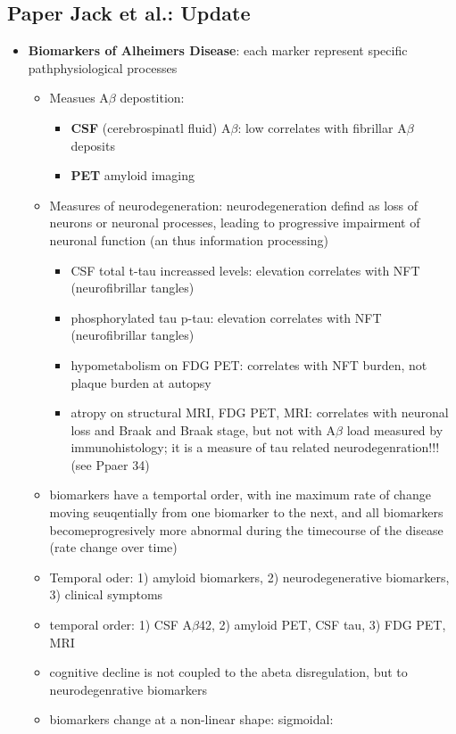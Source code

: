 \documentclass[fleqn]{article}\usepackage{caption}
\begin{document}
\subsection{Paper Jack et al.: Update}
\begin{itemize}
\item \textbf{Biomarkers of Alheimers Disease}:  each marker represent specific pathphysiological processes
\begin{itemize}
\item Measues A$\beta$ depostition:
\begin{itemize}
\item \textbf{CSF} (cerebrospinatl fluid) A$\beta$: low correlates with fibrillar A$\beta$ deposits
\item \textbf{PET} amyloid imaging
\end{itemize} 
\item Measures of neurodegeneration: neurodegeneration defind as loss of neurons or  neuronal processes,  leading to progressive impairment of neuronal function (an thus information processing)
\begin{itemize}
\item CSF total t-tau increassed levels: elevation correlates with NFT (neurofibrillar tangles)
\item phosphorylated tau p-tau: elevation correlates with NFT (neurofibrillar tangles)
\item hypometabolism on FDG PET: correlates with NFT burden, not plaque burden at autopsy
\item atropy on structural MRI, FDG PET, MRI: correlates with neuronal loss and Braak and Braak stage, but not with A$\beta$ load measured by immunohistology; it is a measure of tau related neurodegenration!!! (see Ppaer 34)
\end{itemize}
\item biomarkers have a temportal order, with ine maximum rate of change moving seuqentially from one biomarker to the next, and all biomarkers becomeprogresively more abnormal during the timecourse of the disease (rate change over time)
\item Temporal oder: 1) amyloid biomarkers, 2) neurodegenerative biomarkers, 3) clinical symptoms
\item temporal order: 1) CSF A$\beta$42, 2) amyloid PET, CSF tau, 3) FDG PET, MRI
\item cognitive decline is not coupled to the abeta disregulation, but to neurodegenrative biomarkers
\item biomarkers change at a non-linear shape: sigmoidal:

\end{itemize}
\end{itemize}
\end{document}
